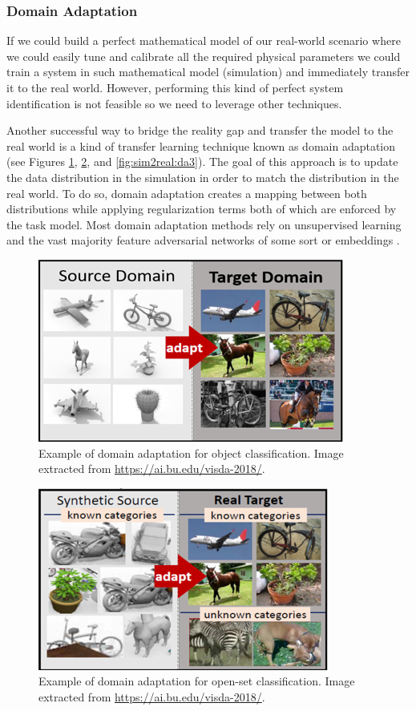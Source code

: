 \subsubsection{Domain Adaptation}

If we could build a perfect mathematical model of our real-world scenario where we could easily tune and calibrate all the required physical parameters we could train a system in such mathematical model (simulation) and immediately transfer it to the real world. However, performing this kind of perfect system identification is not feasible so we need to leverage other techniques.

Another successful way to bridge the reality gap and transfer the model to the real world is a kind of transfer learning technique known as domain adaptation (see Figures \ref{fig:sim2real:da1}, \ref{fig:sim2real:da2}, and \ref{fig:sim2real:da3}). The goal of this approach is to update the data distribution in the simulation in order to match the distribution in the real world. To do so, domain adaptation creates a mapping between both distributions while applying regularization terms both of which are enforced by the task model. Most domain adaptation methods rely on unsupervised learning and the vast majority feature adversarial networks of some sort \cite{Pinheiro2018, Sankaranarayanan2018, Hong2018} or embeddings \cite{Murez2018}.

\begin{figure}[!htb]
	\centering
	\includegraphics[width=0.55\linewidth]{Figures/Sim2Real/domainadapt1.png}
	\caption{Example of domain adaptation for object classification. Image extracted from \url{https://ai.bu.edu/visda-2018/}.}
	\label{fig:sim2real:da1}
\end{figure}

\begin{figure}[!htb]
	\centering
	\includegraphics[width=0.55\linewidth]{Figures/Sim2Real/domainadapt2.png}
	\caption{Example of domain adaptation for open-set classification. Image extracted from \url{https://ai.bu.edu/visda-2018/}.}
	\label{fig:sim2real:da2}
\end{figure}

